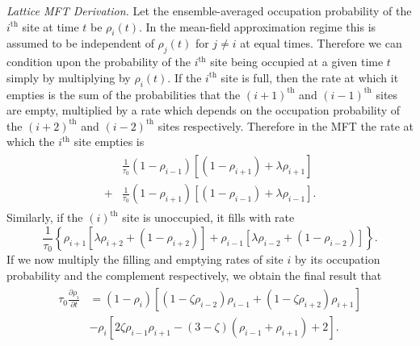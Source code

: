 \documentclass[
reprint,
 amsmath,amssymb,
 aps,
 prl,
]{revtex4-1}
\newcommand{\partDeriv}[2]{\frac{\partial #1}{\partial #2}}
\begin{document}
\textit{Lattice MFT Derivation.} Let the ensemble-averaged occupation probability of the $i^\mathrm{th}$ site at time $t$ be $\rho_i (t)$. In the mean-field approximation regime this is assumed to be independent of $\rho_j(t)$ for $j \neq i $ at
equal times. Therefore we can condition upon the probability of the $i^\mathrm{th}$ site being occupied at a given time $t$ simply by multiplying by $\rho_i (t)$.
If the $i^\mathrm{th}$ site is full, then the rate at which it empties is the sum of the probabilities that the $(i+1)^\mathrm{th}$ and $(i-1)^\mathrm{th}$ sites are empty, multiplied by a rate which depends on the occupation probability
of the $(i+2)^\mathrm{th}$ and $(i-2)^\mathrm{th}$ sites respectively. Therefore in the MFT the rate at which the $i^\mathrm{th}$ site empties is 
\begin{align}
\begin{split}
 &\frac{1}{\tau_0 } (1-\rho_{i-1})\left[ (1 - \rho_{i+1}) + \lambda \rho_{i+1} \right] \\
 +&\frac{1}{\tau_0 } (1-\rho_{i+1})\left[ (1 - \rho_{i-1}) + \lambda \rho_{i-1} \right] .
\end{split}
 \end{align}
Similarly, if the $(i)^\mathrm{th}$ site is unoccupied, it fills with rate
\begin{equation}
\frac{1}{\tau_0 } \left\{ \rho_{i+1} \left[ \lambda \rho_{i+2} + (1-\rho_{i+2}) \right] + \rho_{i-1} \left[ \lambda \rho_{i-2} + (1-\rho_{i-2}) \right] \right\}.
\end{equation}
If we now multiply the filling and emptying rates of site $i$ by its occupation probability and the complement respectively, we obtain the final result that
\begin{align}
\label{eq:latticeMFT}
\begin{split}
 \tau_0 \partDeriv{\rho_i}{t} &= \left( 1-\rho_i \right) \left[ \left(1-\zeta\rho_{i-2} \right) \rho_{i-1} + \left(1-\zeta\rho_{i+2} \right) \rho_{i+1} \right] \\
 &- \rho_i \left[ 2 \zeta \rho_{i-1} \rho_{i+1}  - (3-\zeta)\left(\rho_{i-1} + \rho_{i+1}\right) + 2 \right].
 \end{split}
 \end{align}
\end{document}
